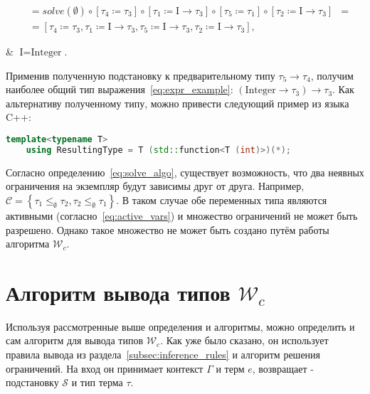 \begin{equation}
\begin{aligned}
        &= solve(\emptyset)                                                                                                                                      \circ \left[ \tau_4 \coloneqq \tau_3 \right] \circ \left[ \tau_1 \coloneqq \text{I} \to \tau_3 \right] \circ \left[ \tau_5 \coloneqq \tau_1 \right] \circ \left[ \tau_2 \coloneqq \text{I} \to \tau_3 \right] &= \\
        &= \left[ \tau_4 \coloneqq \tau_3, \tau_1 \coloneqq \text{I} \to \tau_3, \tau_5 \coloneqq \text{I} \to \tau_3, \tau_2 \coloneqq \text{I} \to \tau_3 \right],
    \end{aligned}
\end{equation}
\begin{eqrem}
    & $\text{I} = \text{Integer}$.\\
\end{eqrem}

Применив полученную подстановку к предварительному типу $\tau_5 \to \tau_4$, получим наиболее общий тип выражения~\ref{eq:expr_example}: $(\text{Integer} \to \tau_3) \to \tau_3$.
Как альтернативу полученному типу, можно привести следующий пример из языка C++:

\begin{lstlisting}[label={lst:type_example},language=C++,caption={Вид полученного типа с точки зрения языка C++.}]
    template<typename T>
    using ResultingType = T (std::function<T (int)>)(*);
\end{lstlisting}

Согласно определению~\ref{eq:solve_algo}, существует возможность, что два неявных ограничения на экземпляр будут зависимы друг от друга.
Например, $\mathcal{C} = \left\{ \tau_1 \leq_{\emptyset} \tau_2, \tau_2 \leq_{\emptyset} \tau_1 \right\}$.
В таком случае обе переменных типа являются активными (согласно~\ref{eq:active_vars}) и множество ограничений не может быть разрешено.
Однако такое множество не может быть создано путём работы алгоритма $\mathcal{W}_c$.


\section{Алгоритм вывода типов $\mathcal{W}_c$}
\label{sec:inference_algo}

Используя рассмотренные выше определения и алгоритмы, можно определить и сам алгоритм для вывода типов $\mathcal{W}_c$.
Как уже было сказано, он использует правила вывода из раздела~\ref{subsec:inference_rules} и алгоритм решения ограничений.
На вход он принимает контекст $\Gamma$ и терм $e$, возвращает - подстановку $\mathcal{S}$ и тип терма $\tau$.

